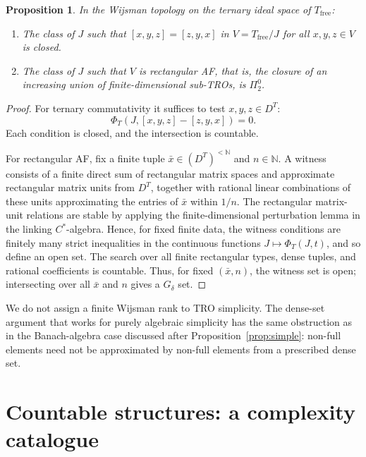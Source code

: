 \documentclass[12pt,fleqn,a4paper]{amsart}
\numberwithin{equation}{section}
\newtheorem{proposition}[theorem]{Proposition}
\theoremstyle{definition}
\newcommand{\N}{\mathbb{N}}
\begin{document}
\begin{proposition}\label{prop:TRO-complexity}
In the Wijsman topology on the ternary ideal space of $T_{\mathrm{free}}$:
\begin{enumerate}
\item The class of $J$ such that $[x,y,z]=[z,y,x]$ in $V=T_{\mathrm{free}}/J$ for all
$x,y,z\in V$ is closed.
\item The class of $J$ such that $V$ is rectangular AF, that is, the closure of an
increasing union of finite-dimensional sub-TROs, is $\Pi^0_2$.
\end{enumerate}
\end{proposition}

\begin{proof}
For ternary commutativity it suffices to test $x,y,z\in D^T$:
\[
        \Phi_T(J,[x,y,z]-[z,y,x])=0.
\]
Each condition is closed, and the intersection is countable.

For rectangular AF, fix a finite tuple $\bar x\in(D^T)^{<\N}$ and $n\in\N$.  A witness
consists of a finite direct sum of rectangular matrix spaces and approximate
rectangular matrix units from $D^T$, together with rational linear combinations of
these units approximating the entries of $\bar x$ within $1/n$.  The rectangular
matrix-unit relations are stable by applying the finite-dimensional perturbation
lemma in the linking $C^*$-algebra.  Hence, for fixed finite data, the witness
conditions are finitely many strict inequalities in the continuous functions
$J\mapsto\Phi_T(J,t)$, and so define an open set.  The search over all finite
rectangular types, dense tuples, and rational coefficients is countable.  Thus, for
fixed $(\bar x,n)$, the witness set is open; intersecting over all $\bar x$ and $n$
gives a $G_\delta$ set.
\end{proof}

We do not assign a finite Wijsman rank to TRO simplicity.  The dense-set argument that
works for purely algebraic simplicity has the same obstruction as in the Banach-algebra
case discussed after Proposition~\ref{prop:simple}: non-full elements need not be
approximated by non-full elements from a prescribed dense set.

\section{Countable structures: a complexity catalogue}
\label{sec:countable-complexity}
\end{document}
